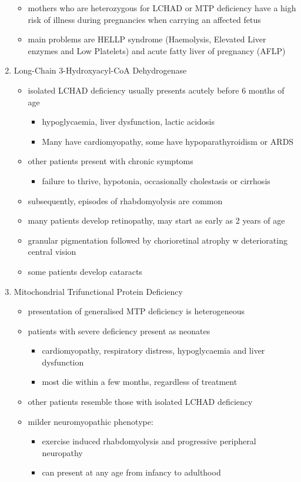 \documentclass{scrartcl}
\begin{document}
\begin{enumerate}
\begin{itemize}
\item mothers who are heterozygous for LCHAD or MTP deficiency have a high
risk of illness during pregnancies when carrying an affected fetus
\item main problems are HELLP syndrome (Haemolysis, Elevated Liver
enzymes and Low Platelets) and acute fatty liver of pregnancy
(AFLP)
\end{itemize}

\item Long-Chain 3-Hydroxyacyl-CoA Dehydrogenase
\label{sec:org7fbdaf4}
\begin{itemize}
\item isolated LCHAD deficiency usually presents acutely before 6 months of age
\begin{itemize}
\item hypoglycaemia, liver dysfunction, lactic acidosis
\item Many have cardiomyopathy, some have hypoparathyroidism or ARDS
\end{itemize}
\item other patients present with chronic symptoms
\begin{itemize}
\item failure to thrive, hypotonia, occasionally cholestasis or cirrhosis
\end{itemize}
\item subsequently, episodes of rhabdomyolysis are common
\item many patients develop retinopathy, may start as early as 2 years of age
\item granular pigmentation followed by chorioretinal atrophy w deteriorating central vision
\item some patients develop cataracts
\end{itemize}

\item Mitochondrial Trifunctional Protein Deficiency
\label{sec:org0f9589c}
\begin{itemize}
\item presentation of generalised MTP deficiency is heterogeneous
\item patients with severe deficiency present as neonates
\begin{itemize}
\item cardiomyopathy, respiratory distress, hypoglycaemia and liver dysfunction
\item most die within a few months, regardless of treatment
\end{itemize}
\item other patients resemble those with isolated LCHAD deficiency
\item milder neuromyopathic phenotype:
\begin{itemize}
\item exercise induced rhabdomyolysis and progressive peripheral
neuropathy
\item can present at any age from infancy to adulthood
\end{itemize}
\end{itemize}


\end{enumerate}
\end{document}
